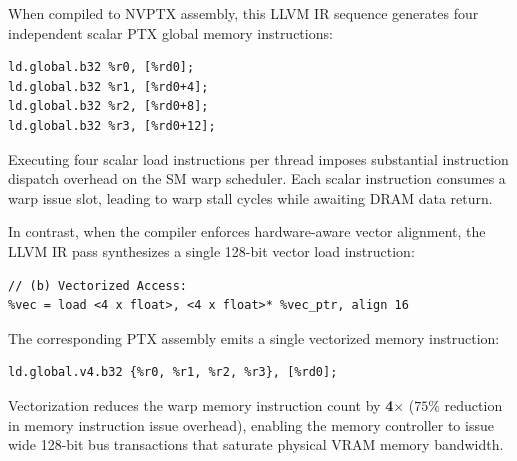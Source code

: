 \documentclass[10pt,journal,compsoc]{IEEEtran}
\begin{document}
When compiled to NVPTX assembly, this LLVM IR sequence generates four independent scalar PTX global memory instructions:
\begin{lstlisting}
ld.global.b32 %r0, [%rd0];
ld.global.b32 %r1, [%rd0+4];
ld.global.b32 %r2, [%rd0+8];
ld.global.b32 %r3, [%rd0+12];
\end{lstlisting}

Executing four scalar load instructions per thread imposes substantial instruction dispatch overhead on the SM warp scheduler. Each scalar instruction consumes a warp issue slot, leading to warp stall cycles while awaiting DRAM data return.

In contrast, when the compiler enforces hardware-aware vector alignment, the LLVM IR pass synthesizes a single 128-bit vector load instruction:
\begin{lstlisting}
// (b) Vectorized Access:
%vec = load <4 x float>, <4 x float>* %vec_ptr, align 16
\end{lstlisting}

The corresponding PTX assembly emits a single vectorized memory instruction:
\begin{lstlisting}
ld.global.v4.b32 {%r0, %r1, %r2, %r3}, [%rd0];
\end{lstlisting}

Vectorization reduces the warp memory instruction count by \textbf{4$\times$} ($75\%$ reduction in memory instruction issue overhead), enabling the memory controller to issue wide 128-bit bus transactions that saturate physical VRAM memory bandwidth.
\end{document}
